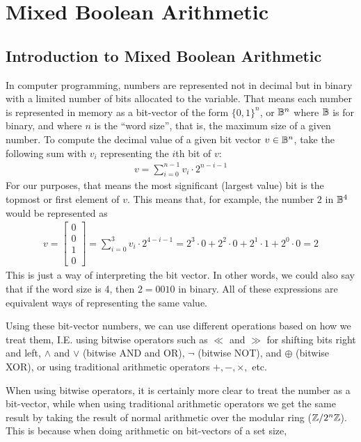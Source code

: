 \section{Mixed Boolean Arithmetic}
\subsection{Introduction to Mixed Boolean Arithmetic}
In computer programming, numbers are represented
not in decimal but in binary with a limited number of bits allocated to the 
variable. That means each number is represented in memory as a bit-vector of
the form $\{0,1\}^n$, or $\mathbb{B}^n$ where $\mathbb{B}$ is for binary, and where $n$ is the ``word size'', that is, the maximum 
size of a given number. To compute the decimal value of a given bit vector $v \in \mathbb{B}^n$, 
take the following sum with $v_i$ representing the $i$th bit of $v$:
\begin{align*}
    v = \sum_{i = 0}^{n-1} v_i \cdot 2^{n-i-1}
\end{align*}
For our purposes, that means the most significant (largest value) bit is the topmost
or first element of $v$. This means that, for example, the number $2$ in $\mathbb{B}^4$ would be represented as 
\begin{align*}
    v = \begin{bmatrix}
        0 \\ 0 \\1 \\0
    \end{bmatrix} = \sum_{i=0}^{3}v_i \cdot 2^{4-i-1} = 2^3 \cdot 0 + 2^2 \cdot 0 + 2^1 \cdot 1 + 2^0 \cdot 0 = 2
\end{align*}
This is just a way of interpreting the bit vector. In other words, we could also say that 
if the word size is 4, then $2 = 0010$ in binary. All of these expressions are
equivalent ways of representing the same value.
\par Using these bit-vector numbers, we can use different
operations based on how we treat them, I.E. using bitwise operators such as
$\ll$ and $\gg$ for shifting bits right and left, $\land$ and $\lor$ (bitwise AND and OR), $\neg$ (bitwise NOT), 
and $\oplus$ (bitwise XOR), or using traditional arithmetic operators $+, -, \times,$ etc.
\par When using bitwise operators, it is certainly more clear to treat the 
number as a bit-vector, while when using traditional arithmetic operators
we get the same result by taking the result of normal arithmetic over the modular ring 
($\mathbb{Z}/2^n\mathbb{Z}$). This is because when doing arithmetic on bit-vectors of a set size, 
